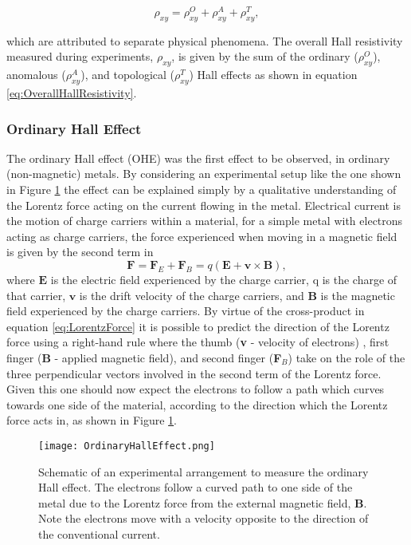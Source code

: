     \begin{equation}\label{eq:OverallHallResistivity}
    	\rho_{xy} = \rho_{xy}^{O} + \rho_{xy}^{A} + \rho_{xy}^{T},    
    \end{equation}
	
    which are attributed to separate physical phenomena. The overall Hall resistivity measured during experiments, $\rho_{xy}$, is given by the sum of the ordinary ($\rho_{xy}^{O}$), anomalous ($\rho_{xy}^{A}$), and topological ($\rho_{xy}^{T}$) Hall effects as shown in equation \ref{eq:OverallHallResistivity}.

        \subsubsection{Ordinary Hall Effect}\label{subsubsec:OHE}
        The ordinary Hall effect (OHE) was the first effect to be observed, in ordinary (non-magnetic) metals. By considering an experimental setup like the one shown in Figure \ref{fig:OHE} the effect can be explained simply by a qualitative understanding of the Lorentz force acting on the current flowing in the metal. Electrical current is the motion of charge carriers within a material, for a simple metal with electrons acting as charge carriers, the force experienced when moving in a magnetic field is given by the second term in
        \begin{equation}\label{eq:LorentzForce}
	        \textbf{F}= \textbf{F}_{E} + \textbf{F}_{B}  = q(\textbf{E}+\textbf{v}\times\textbf{B}),
        \end{equation}
        where $\textbf{E}$ is the electric field experienced by the charge carrier, q is the charge of that carrier, $\textbf{v}$ is the drift velocity of the charge carriers, and $\textbf{B}$ is the magnetic field experienced by the charge carriers. By virtue of the cross-product in equation \ref{eq:LorentzForce} it is possible to predict the direction of the Lorentz force using a right-hand rule where the thumb (\textbf{v} - velocity of electrons) , first finger (\textbf{B} - applied magnetic field), and second finger (\textbf{F}$_{B}$) take on the role of the three perpendicular vectors involved in the second term of the Lorentz force. Given this one should now expect the electrons to follow a path which curves towards one side of the material, according to the direction which the Lorentz force acts in, as shown in Figure \ref{fig:OHE}.
        \begin{figure}[t]
        	\centering
	        \texttt{[image: OrdinaryHallEffect.png]}
    	    \caption{Schematic of an experimental arrangement to measure the ordinary Hall effect. The electrons follow a curved path to one side of the metal due to the Lorentz force from the external magnetic field, \textbf{B}. Note the electrons move with a velocity opposite to the direction of the conventional current.}
	        \label{fig:OHE}
        \end{figure}
